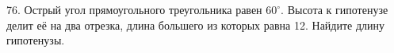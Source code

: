 76. Острый угол прямоугольного треугольника равен $60^\circ.$ Высота к гипотенузе делит её на два отрезка, длина большего из которых равна 12. Найдите длину гипотенузы.\\
